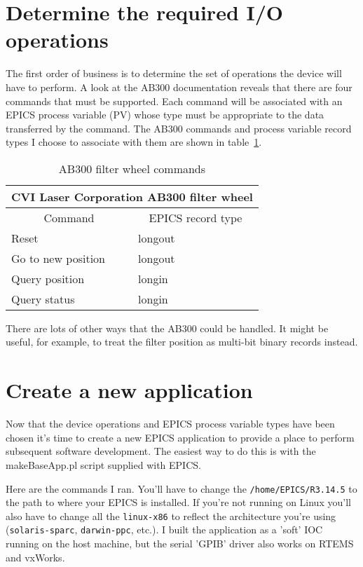 \documentclass[twoside]{article}
\begin{document}
\section{Determine the required I/O operations}
The first order of business is to determine the set of operations the
device will have to perform.
A look at the AB300 documentation reveals that there are four
commands that must be supported.
Each command will
be associated with an EPICS process variable (PV) whose type must be
appropriate to the data transferred by the command.
The AB300 commands and
process variable record types I choose to associate with them are shown
in table~\ref{commandList}.
\begin{table}[bht]
\caption{AB300 filter wheel commands\label{commandList}}
\begin{center}
\begin{tabular}{|l|l|}
\hline
\multicolumn{2}{|c|}{CVI Laser Corporation AB300 filter wheel} \\
\hline
\multicolumn{1}{|c|}{Command}  &\multicolumn{1}{c|}{EPICS record type} \\
\hline
Reset                &longout \\
Go to new position   &longout \\
Query position       &longin \\
Query status         &longin \\
\hline
\end{tabular}
\end{center}
\end{table}
There are lots of other ways that the AB300 could be handled.  It might
be useful, for example,  to treat the filter position as
multi-bit binary records instead.

\section{Create a new application}
Now that the device operations and EPICS process variable types have
been chosen it's time to create a new EPICS application to provide
a place to perform subsequent software development.
The easiest way to do this is with the makeBaseApp.pl script supplied
with EPICS.

Here are the commands I ran.   You'll have to change the
{\tt /home/EPICS/R3.14.5} to the path to where your EPICS is installed.
If you're
not running on Linux you'll also have to change all the {\tt linux-x86} to
reflect the architecture you're using ({\tt solaris-sparc}, {\tt darwin-ppc}, etc.).
I built the application as a 'soft' IOC running on the host machine, but
the serial 'GPIB' driver also works on RTEMS and vxWorks.
\end{document}
